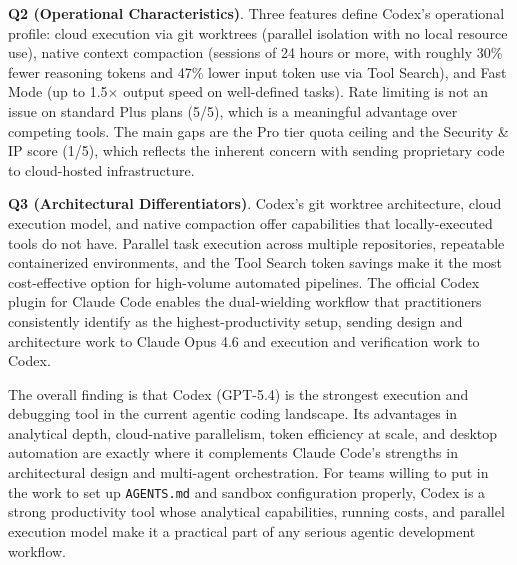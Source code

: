 \documentclass[conference]{IEEEtran}
\begin{document}
\textbf{Q2 (Operational Characteristics)}. Three features define Codex's operational profile: cloud execution via git worktrees (parallel isolation with no local resource use), native context compaction (sessions of 24 hours or more, with roughly 30\% fewer reasoning tokens and 47\% lower input token use via Tool Search), and Fast Mode (up to 1.5$\times$ output speed on well-defined tasks). Rate limiting is not an issue on standard Plus plans (5/5), which is a meaningful advantage over competing tools. The main gaps are the Pro tier quota ceiling and the Security \& IP score (1/5), which reflects the inherent concern with sending proprietary code to cloud-hosted infrastructure.

\textbf{Q3 (Architectural Differentiators)}. Codex's git worktree architecture, cloud execution model, and native compaction offer capabilities that locally-executed tools do not have. Parallel task execution across multiple repositories, repeatable containerized environments, and the Tool Search token savings make it the most cost-effective option for high-volume automated pipelines. The official Codex plugin for Claude Code enables the dual-wielding workflow that practitioners consistently identify as the highest-productivity setup, sending design and architecture work to Claude Opus 4.6 and execution and verification work to Codex.

The overall finding is that Codex (GPT-5.4) is the strongest execution and debugging tool in the current agentic coding landscape. Its advantages in analytical depth, cloud-native parallelism, token efficiency at scale, and desktop automation are exactly where it complements Claude Code's strengths in architectural design and multi-agent orchestration. For teams willing to put in the work to set up \texttt{AGENTS.md} and sandbox configuration properly, Codex is a strong productivity tool whose analytical capabilities, running costs, and parallel execution model make it a practical part of any serious agentic development workflow.
\end{document}
